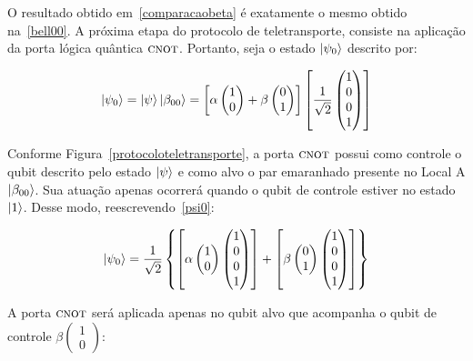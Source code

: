 O resultado obtido em~\eqref{comparacaobeta} é exatamente o mesmo obtido na~\eqref{bell00}.
A próxima etapa do protocolo de teletransporte, consiste na aplicação da porta lógica quântica \(\operatorname{\textsc{cnot}}\). Portanto, seja o estado $\ket{\psi_0}$ descrito por:

\begin{equation}\label{psi0}
\ket{\psi_0}=\ket{\psi}\ket{\beta_{00}}=\left[\alpha \begin{pmatrix}
1 \\
0 
\end{pmatrix} + \beta \begin{pmatrix}
0 \\
1
\end{pmatrix}\right] \left[\frac{1}{\sqrt{2}} \begin{pmatrix}
1 \\
0 \\
0 \\
1
\end{pmatrix}\right]
\end{equation}

Conforme Figura~\ref{protocoloteletransporte}, a porta \(\operatorname{\textsc{cnot}}\) possui como controle o qubit descrito pelo estado $\ket{\psi}$ e como alvo o par emaranhado presente no Local A $\ket{\beta_{00}}$. Sua atuação apenas ocorrerá quando o qubit de controle estiver no estado $\ket{1}$. Desse modo, reescrevendo~\eqref{psi0}:

\begin{equation}
\ket{\psi_0} = \frac{1}{\sqrt{2}}\left\{\left[\alpha \begin{pmatrix}
1 \\
0 
\end{pmatrix}  \begin{pmatrix}
1 \\
0 \\
0 \\
1
\end{pmatrix}\right] + \left[\beta \begin{pmatrix}
0 \\
1
\end{pmatrix}  \begin{pmatrix}
1 \\
0 \\
0 \\
1
\end{pmatrix}\right] \right\}
\end{equation}

A porta \(\operatorname{\textsc{cnot}}\) será aplicada apenas no qubit alvo que acompanha o qubit de controle $\beta \begin{pmatrix}
1 \\
0 
\end{pmatrix}$:



